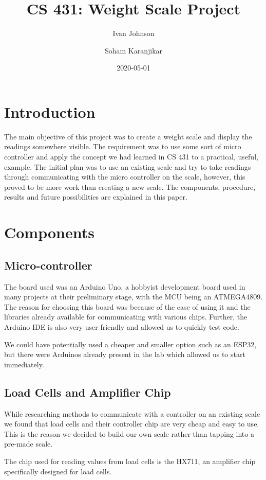 \documentclass[letterpaper,11pt]{article}
\title{CS 431: Weight Scale Project}
\author{Ivan Johnson \and Soham Karanjikar}
\date{2020-05-01}
\begin{document}
\maketitle

\newpage
\section{Introduction}
The main objective of this project was to create a weight scale and display the
readings somewhere visible. The requirement was to use some sort of micro
controller and apply the concept we had learned in CS 431 to a practical,
useful, example. The initial plan was to use an existing scale and try to take
readings through communicating with the micro controller on the scale, however,
this proved to be more work than creating a new scale. The components,
procedure, results and future possibilities are explained in this paper.


\section{Components}
\subsection{Micro-controller}
The board used was an Arduino Uno, a hobbyist development board used in many
projects at their preliminary stage, with the MCU being an ATMEGA4809. The
reason for choosing this board was because of the ease of using it and the
libraries already available for communicating with various chips. Further, the
Arduino IDE is also very user friendly and allowed us to quickly test code.

We could have potentially used a cheaper and smaller option such as an ESP32,
but there were Arduinos already present in the lab which allowed us to start
immediately.

\subsection{Load Cells and Amplifier Chip}
While researching methods to communicate with a controller on an existing scale
we found that load cells and their controller chip are very cheap and easy to
use. This is the reason we decided to build our own scale rather than tapping
into a pre-made scale.

The chip used for reading values from load cells is the HX711, an amplifier chip
specifically designed for load cells.
\end{document}
